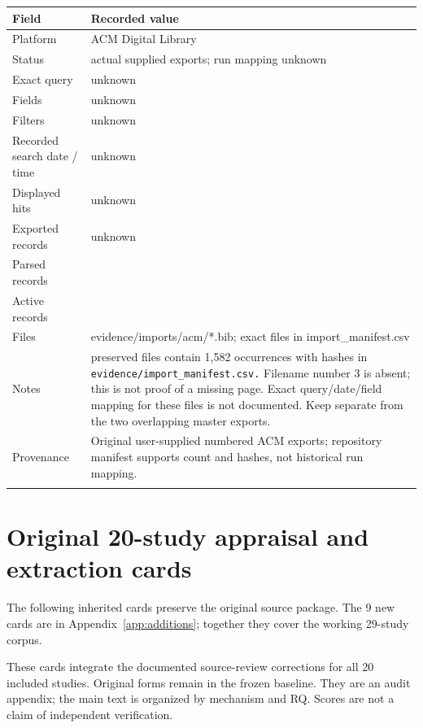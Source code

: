 \begin{longtable}{>{\raggedright\arraybackslash}p{}>{\raggedright\arraybackslash}p{}}
\toprule
\textbf{Field} & \textbf{Recorded value}\\\midrule\endhead
Platform & ACM Digital Library\\\addlinespace
Status & actual supplied exports; run mapping unknown\\\addlinespace
Exact query & unknown\\\addlinespace
Fields & unknown\\\addlinespace
Filters & unknown\\\addlinespace
Recorded search date / time & unknown\\\addlinespace
Displayed hits & unknown\\\addlinespace
Exported records & unknown\\\addlinespace
Parsed records & 1582\\\addlinespace
Active records & 1582\\\addlinespace
Files & evidence/imports/acm/*.bib; exact files in import\_manifest.csv\\\addlinespace
Notes & 79 preserved files contain 1,582 occurrences with hashes in \nolinkurl{evidence/import_manifest.csv.} Filename number 3 is absent; this is not proof of a missing page. Exact query/date/field mapping for these files is not documented. Keep separate from the two overlapping master exports.\\\addlinespace
Provenance & Original user-supplied numbered ACM exports; repository manifest supports count and hashes, not historical run mapping.\\\addlinespace
\bottomrule\end{longtable}

\section{Original 20-study appraisal and extraction cards}
The following inherited cards preserve the original source package. The 9 new cards are in Appendix~\ref{app:additions}; together they cover the working 29-study corpus.

These cards integrate the documented source-review corrections for all 20 included studies. Original forms remain in the frozen baseline. They are an audit appendix; the main text is organized by mechanism and RQ. Scores are not a claim of independent verification.

